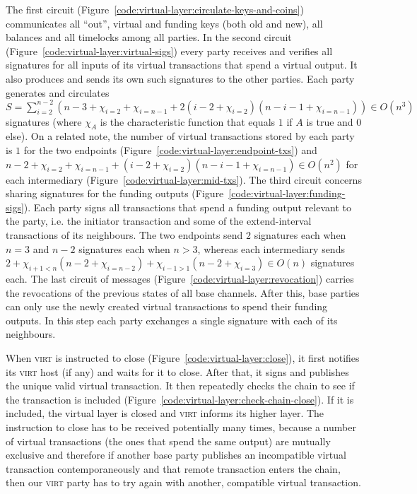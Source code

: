   The first circuit (Figure~\ref{code:virtual-layer:circulate-keys-and-coins})
  communicates all ``out'', virtual and funding keys (both old and new), all
  balances and all timelocks among all parties. In the second circuit
  (Figure~\ref{code:virtual-layer:virtual-sigs}) every party receives and
  verifies all signatures for all inputs of its virtual transactions that spend
  a virtual output. It also produces and sends its own such signatures to the
  other parties. Each party generates and circulates $S = \sum\limits_{i =
  2}^{n-2} (n-3 + \chi_{i = 2} + \chi_{i = n - 1} + 2(i - 2 + \chi_{i = 2})(n -
  i - 1 + \chi_{i = n - 1})) \in O(n^3)$ signatures (where $\chi_A$ is the
  characteristic function that equals $1$ if $A$ is true and $0$ else).
On a related note, the
  number of virtual transactions stored by each party is $1$ for the two
  endpoints (Figure~\ref{code:virtual-layer:endpoint-txs}) and $n - 2 + \chi_{i
  = 2} + \chi_{i = n - 1} +  (i - 2 + \chi_{i = 2}) (n - i - 1 + \chi_{i = n-1})
  \in O(n^2)$ for each intermediary (Figure~\ref{code:virtual-layer:mid-txs}).
  The third circuit concerns sharing signatures for the funding outputs
  (Figure~\ref{code:virtual-layer:funding-sigs}). Each party signs all
  transactions that spend a funding output relevant to the party, i.e. the
  initiator transaction and some of the extend-interval transactions of its
  neighbours. The two endpoints send $2$ signatures each when $n = 3$ and $n -
  2$ signatures each when $n > 3$, whereas each intermediary sends $2 + \chi_{i
  + 1 < n}(n - 2 + \chi_{i = n - 2}) + \chi_{i - 1 > 1}(n - 2 + \chi_{i = 3})
  \in O(n)$ signatures each. The last circuit of messages
  (Figure~\ref{code:virtual-layer:revocation}) carries the revocations of the
  previous states of all base channels. After this, base parties can only use
  the newly created virtual transactions to spend their funding outputs. In this
  step each party exchanges a single signature with each of its neighbours.

  When \textsc{virt} is instructed to close
  (Figure~\ref{code:virtual-layer:close}), it first notifies its \textsc{virt}
  host (if any) and waits for it to close. After that, it signs and publishes
  the unique valid virtual transaction. It then repeatedly checks the chain to
  see if the transaction is included
  (Figure~\ref{code:virtual-layer:check-chain-close}). If it is included, the
  virtual layer is closed and \textsc{virt} informs its higher layer. The
  instruction to close has to be received potentially many times, because a
  number of virtual transactions (the ones that spend the same output) are
  mutually exclusive and therefore if another base party publishes an
  incompatible virtual transaction contemporaneously and that remote transaction
  enters the chain, then our \textsc{virt} party has to try again with another,
  compatible virtual transaction.
